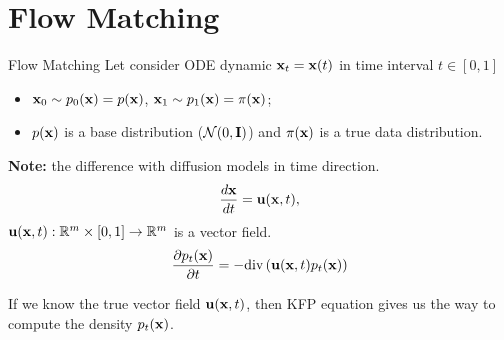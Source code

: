 \section{Flow Matching}
\begin{frame}{Flow Matching}
	Let consider ODE dynamic $\mathbf{x}_t = \mathbf{x}(t)$ in time interval $t \in [0, 1]$
	\begin{itemize}
	\item $\mathbf{x}_0 \sim p_0(\mathbf{x}) = p(\mathbf{x})$, $\mathbf{x}_1 \sim p_1(\mathbf{x}) =  \pi(\mathbf{x})$;
	\item $p(\mathbf{x})$ is a base distribution ($\mathcal{N}(0, \mathbf{I})$) and $\pi(\mathbf{x})$ is a true data distribution.
	\end{itemize} 
	\textbf{Note:} the difference with diffusion models in time direction.
	\[
		\frac{d \mathbf{x}}{dt} = \mathbf{u} (\mathbf{x}, t),
	\]
	$\mathbf{u} (\mathbf{x}, t): \mathbb{R}^m \times [0, 1] \rightarrow \mathbb{R}^m$ is a vector field.
	\[
		\frac{\partial p_t(\mathbf{x})}{\partial t} = - \text{div}\left(\mathbf{u}(\mathbf{x}, t) p_t(\mathbf{x})\right) 
	\]
	
	If we know the true vector field $\mathbf{u} (\mathbf{x}, t)$, then KFP equation gives us the way to compute the density $p_t(\mathbf{x})$.
\end{frame}

